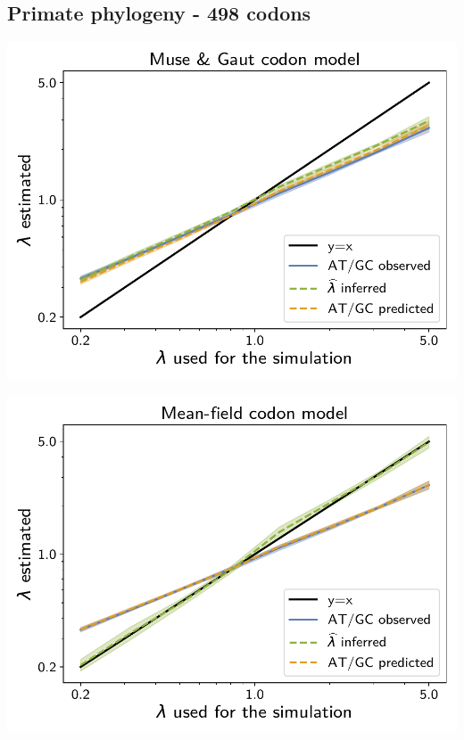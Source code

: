 \documentclass{article}
\begin{document}
\subsection{Primate phylogeny - 498 codons}

\begin{center}
    \begin{minipage}{0.325\linewidth}
        \includegraphics[width=\linewidth, page=1]{inference_supp_mat/PrimatesExons1Mu1.0_lambda_MG.pdf}
    \end{minipage}
    \hfill
    \begin{minipage}{0.325\linewidth}
        \includegraphics[width=\linewidth, page=1]{inference_supp_mat/PrimatesExons1Mu1.0_lambda_MF.pdf}

\end{minipage}
\end{center}
\end{document}
